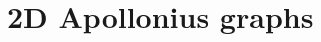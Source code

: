 
\chapter{2D Apollonius graphs}
\label{chapter-apollonius2}

\vspace*{-10mm}
\minitoc
\vspace*{30mm}



%
